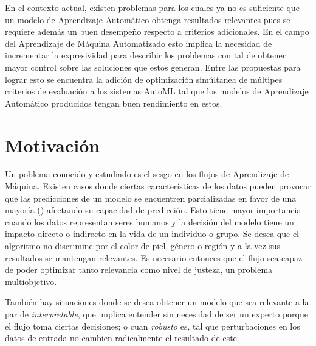 En el contexto actual, existen problemas para los cuales ya no es suficiente que un modelo de Aprendizaje Autom\'atico obtenga resultados relevantes pues se requiere adem\'as un buen desempe\~no respecto a criterios adicionales. En el campo del Aprendizaje de M\'aquina Automatizado esto implica la necesidad de incrementar la expresividad para describir los problemas con tal de obtener mayor control sobre las soluciones que estos generan. Entre las propuestas  para lograr esto se encuentra la adici\'on  de optimizaci\'on sim\'ultanea de m\'ultipes criterios de evaluaci\'on a los sistemas AutoML  tal que los modelos de Aprendizaje Autom\'atico producidos tengan buen rendimiento en estos.   

\section*{Motivaci\'on}
Un poblema conocido y estudiado es el sesgo en los flujos de Aprendizaje de M\'aquina. Existen casos donde ciertas caracter\'isticas de los datos pueden provocar que las predicciones de un modelo se encuentren parcializadas en favor de una mayor\'ia  (\cite{mehrabi2021survey}) afectando su capacidad de predicci\'on. Esto tiene mayor importancia cuando los datos representan seres humanos y la decisi\'on del modelo tiene un impacto directo o indirecto en la vida de un individuo o grupo. Se desea que el algoritmo no discrimine por el color de piel, g\'enero o regi\'on y a la vez sus resultados se mantengan relevantes. Es necesario entonces que el flujo sea capaz de poder optimizar tanto  relevancia como  nivel de justeza, un problema multiobjetivo.

Tambi\'en hay situaciones donde se desea obtener un modelo que sea relevante a la par de \textit{interpretable}, que implica entender sin necesidad de ser un experto porque el flujo toma ciertas decisiones; o cuan \textit{robusto} es, tal que perturbaciones en los datos de entrada no cambien radicalmente el resultado de este.

